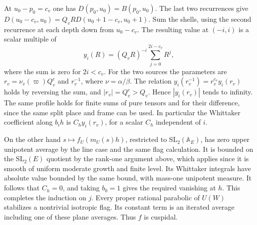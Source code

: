 At \(u_0-p_0=c_v\) one has \(D(p_0,u_0)=B(p_0,u_0)\). The last
two recurrences give
\(D(u_0-c_v,u_0)=Q_vR D(u_0+1-c_v,u_0+1)\).
Sum the shells, using the second recurrence at each depth down
from \(u_0-c_v\). The resulting value at \((-i,i)\) is a scalar
multiple of
\[
 y_i(R)=(Q_vR)^{-i}\sum_{j=0}^{2i-c_v}R^j,
\]
where the sum is zero for \(2i<c_v\). For the two sources the
parameters are \(r_v=\nu_v(\varpi)Q_v^e\) and \(r_v^{-1}\),
where \(\nu=\alpha/\beta\). The relation
\(y_i(r_v^{-1})=r_v^{c_v}y_i(r_v)\) holds by reversing the sum,
and \(|r_v|=Q_v^e>Q_v\). Hence \(|y_i(r_v)|\) tends to infinity.
The same profile holds for finite sums of pure tensors and for
their difference, since the same split place and frame can be
used. In particular the Whittaker coefficient along \(b_i h\) is
\(C_h y_i(r_v)\), for a scalar \(C_h\) independent of \(i\).

On the other hand \(s\mapsto f_U(m_U(s)h)\), restricted to
\(\mathrm{SL}_2(\mathbb A_E)\), has zero upper unipotent average
by the line case and the same flag calculation. It is bounded on
the \(\mathrm{SL}_2(E)\) quotient by the rank-one argument above,
which applies since it is smooth of uniform moderate growth and
finite level. Its Whittaker integrals have absolute value bounded
by the same bound, with mass-one unipotent measure. It follows that
\(C_h=0\), and taking \(b_0=1\) gives the required vanishing at
\(h\). This completes the induction on \(j\). Every proper
rational parabolic of \(U(W)\) stabilizes a nontrivial isotropic
flag. Its constant term is an iterated average including one of
these plane averages. Thus \(f\) is cuspidal.


